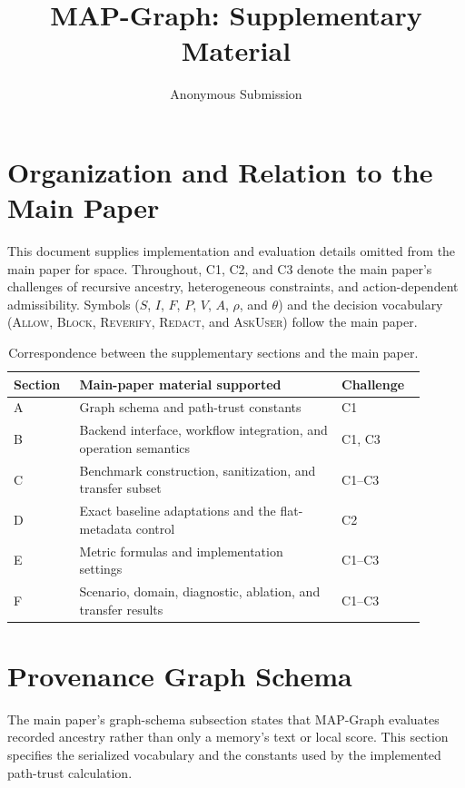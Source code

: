 \documentclass[letterpaper]{article} %
\title{MAP-Graph: Supplementary Material}
\author{Anonymous Submission}
\begin{document}
\maketitle
\appendix

\section*{Organization and Relation to the Main Paper}

This document supplies implementation and evaluation details omitted from the
main paper for space.  Throughout, C1, C2, and C3 denote the main paper's
challenges of recursive ancestry, heterogeneous constraints, and
action-dependent admissibility.  Symbols ($S$, $I$, $F$, $P$, $V$, $A$,
$\rho$, and $\theta$) and the decision vocabulary
(\textsc{Allow}, \textsc{Block}, \textsc{Reverify}, \textsc{Redact}, and
\textsc{AskUser}) follow the main paper.

\begin{table}[!ht]
\centering
\small
\caption{Correspondence between the supplementary sections and the main paper.}
\label{tab:appendix-map}
\begin{tabular}{@{}p{0.14\linewidth}p{0.58\linewidth}p{0.18\linewidth}@{}}
\toprule
Section & Main-paper material supported & Challenge \\
\midrule
A & Graph schema and path-trust constants & C1 \\
B & Backend interface, workflow integration, and operation semantics & C1, C3 \\
C & Benchmark construction, sanitization, and transfer subset & C1--C3 \\
D & Exact baseline adaptations and the flat-metadata control & C2 \\
E & Metric formulas and implementation settings & C1--C3 \\
F & Scenario, domain, diagnostic, ablation, and transfer results & C1--C3 \\
\bottomrule
\end{tabular}
\end{table}

\section{Provenance Graph Schema}
\label{app:schema}

The main paper's graph-schema subsection states that MAP-Graph evaluates
recorded ancestry rather than only a memory's text or local score.  This
section specifies the serialized vocabulary and the constants used by the
implemented path-trust calculation.
\end{document}
